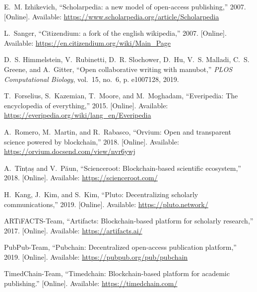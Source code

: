 \documentclass[14pt]{article}
\begin{document}
\begin{thebibliography}{10}
\BIBentryALTinterwordspacing
E.~M. Izhikevich, ``Scholarpedia: a new model of open-access publishing,''
  2007. [Online]. Available:
  \url{https://www.scholarpedia.org/article/Scholarpedia}
\BIBentrySTDinterwordspacing

\BIBentryALTinterwordspacing
L.~Sanger, ``Citizendium: a fork of the english wikipedia,'' 2007. [Online].
  Available: \url{https://en.citizendium.org/wiki/Main_Page}
\BIBentrySTDinterwordspacing

D.~S. Himmelstein, V.~Rubinetti, D.~R. Slochower, D.~Hu, V.~S. Malladi, C.~S.
  Greene, and A.~Gitter, ``Open collaborative writing with manubot,''
  \emph{PLOS Computational Biology}, vol.~15, no.~6, p. e1007128, 2019.

\BIBentryALTinterwordspacing
T.~Forselius, S.~Kazemian, T.~Moore, and M.~Moghadam, ``Everipedia: The
  encyclopedia of everything,'' 2015. [Online]. Available:
  \url{https://everipedia.org/wiki/lang_en/Everipedia}
\BIBentrySTDinterwordspacing

\BIBentryALTinterwordspacing
A.~Romero, M.~Martin, and R.~Rabasco, ``Orvium: Open and transparent science
  powered by blockchain,'' 2018. [Online]. Available:
  \url{https://orvium.docsend.com/view/nvr6ywj}
\BIBentrySTDinterwordspacing

\BIBentryALTinterwordspacing
A.~Tînțaș and V.~Păun, ``Scienceroot: Blockchain-based scientific
  ecosystem,'' 2018. [Online]. Available: \url{https://scienceroot.com/}
\BIBentrySTDinterwordspacing

\BIBentryALTinterwordspacing
H.~Kang, J.~Kim, and S.~Kim, ``Pluto: Decentralizing scholarly
  communications,'' 2019. [Online]. Available: \url{https://pluto.network/}
\BIBentrySTDinterwordspacing

\BIBentryALTinterwordspacing
ARTiFACTS-Team, ``Artifacts: Blockchain-based platform for scholarly
  research,'' 2017. [Online]. Available: \url{https://artifacts.ai/}
\BIBentrySTDinterwordspacing

\BIBentryALTinterwordspacing
PubPub-Team, ``Pubchain: Decentralized open-access publication platform,''
  2019. [Online]. Available: \url{https://pubpub.org/pub/pubchain}
\BIBentrySTDinterwordspacing

\BIBentryALTinterwordspacing
TimedChain-Team, ``Timedchain: Blockchain-based platform for academic
  publishing.'' [Online]. Available: \url{https://timedchain.com/}
\BIBentrySTDinterwordspacing


\end{thebibliography}
\end{document}
